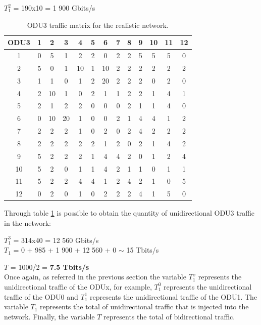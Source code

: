 $T_1^2$ = 190x10 = 1 900 Gbits/s \qquad
\vspace{11pt}
\begin{table}[H]
\centering
\begin{tabular}{|c|c|c|c|c|c|c|c|c|c|c|c|c|}
\hline
\textbf{ODU3} & 1 & 2 & 3 & 4 & 5 & 6 & 7 & 8 & 9 & 10 & 11 & 12 \\ \hline
1 & 0 & 5 & 1 & 2 & 2 & 0 & 2 & 2 & 5 & 5 & 5 & 0 \\ \hline
2 & 5 & 0 & 1 & 10 & 1 & 10 & 2 & 2 & 2 & 2 & 2 & 2 \\ \hline
3 & 1 & 1 & 0 & 1 & 2 & 20 & 2 & 2 & 2 & 0 & 2 & 0 \\ \hline
4 & 2 & 10 & 1 & 0 & 2 & 1 & 1 & 2 & 2 & 1 & 4 & 1 \\ \hline
5 & 2 & 1 & 2 & 2 & 0 & 0 & 0 & 2 & 1 & 1 & 4 & 0 \\ \hline
6 & 0 & 10 & 20 & 1 & 0 & 0 & 2 & 1 & 4 & 4 & 1 & 2 \\ \hline
7 & 2 & 2 & 2 & 1 & 0 & 2 & 0 & 2 & 4 & 2 & 2 & 2 \\ \hline
8 & 2 & 2 & 2 & 2 & 2 & 1 & 2 & 0 & 2 & 1 & 4 & 2 \\ \hline
9 & 5 & 2 & 2 & 2 & 1 & 4 & 4 & 2 & 0 & 1 & 2 & 4 \\ \hline
10 & 5 & 2 & 0 & 1 & 1 & 4 & 2 & 1 & 1 & 0 & 1 & 1 \\ \hline
11 & 5 & 2 & 2 & 4 & 4 & 1 & 2 & 4 & 2 & 1 & 0 & 5 \\ \hline
12 & 0 & 2 & 0 & 1 & 0 & 2 & 2 & 2 & 4 & 1 & 5 & 0 \\ \hline
\end{tabular}
\caption{ODU3 traffic matrix for the realistic network.}
\label{referenceODU3}
\end{table}

Through table \ref{referenceODU3} is possible to obtain the quantity of unidirectional ODU3 traffic in the network:

$T_1^3$ = 314x40 = 12 560 Gbits/s \qquad \\

\vspace{11pt}
$T_{1}$ = 0 + 985 + 1 900 + 12 560 + 0 $\sim$ 15 Tbits/s \qquad

$T$ = 1000/2 = \textbf{7.5 Tbits/s}\\

Once again, as referred in the previous section the variable $T_1^x$ represents the unidirectional traffic of the ODUx, for example, $T_1^0$ represents the unidirectional traffic of the ODU0 and $T_1^1$ represents the unidirectional traffic of the ODU1. The variable $T_{1}$ represents the total of unidirectional traffic that is injected into the network. Finally, the variable $T$ represents the total of bidirectional traffic.

